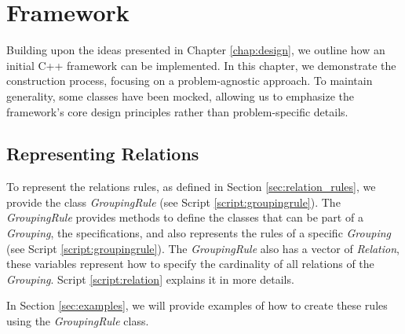 
\chapter{Framework} \label{chap:framework}

    Building upon the ideas presented in Chapter \ref{chap:design}, we outline how an initial C++ framework can be implemented. In this chapter, we demonstrate the construction process, focusing on a problem-agnostic approach. To maintain generality, some classes have been mocked, allowing us to emphasize the framework's core design principles rather than problem-specific details.
    

    \section{Representing Relations}
        To represent the relations rules, as defined in Section \ref{sec:relation_rules}, we provide the class \textit{GroupingRule} (see Script \ref{script:groupingrule}).
        The \textit{GroupingRule} provides methods to define the classes that can be part of a \textit{Grouping}, the specifications, and also represents the rules of a specific \textit{Grouping} (see Script \ref{script:groupingrule}). The \textit{GroupingRule} also has a vector of \textit{Relation}, these variables represent how to specify the cardinality of all relations of the \textit{Grouping}. Script \ref{script:relation} explains it in more details.
        
        In Section \ref{sec:examples}, we will provide examples of how to create these rules using the \textit{GroupingRule} class.
        
